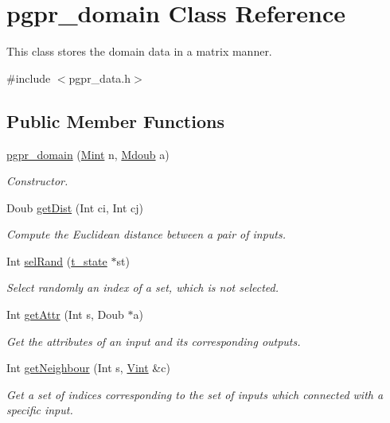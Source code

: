 \hypertarget{classpgpr__domain}{\section{pgpr\-\_\-domain Class Reference}
\label{classpgpr__domain}
}


This class stores the domain data in a matrix manner.  




{\ttfamily \#include $<$pgpr\-\_\-data.\-h$>$}

\subsection*{Public Member Functions}
\begin{DoxyCompactItemize}
\item 
\hyperlink{classpgpr__domain_ac527084df0c657962f29a554da0b3eea}{pgpr\-\_\-domain} (\hyperlink{classpgpr__matrix}{Mint} n, \hyperlink{classpgpr__matrix}{Mdoub} a)
\begin{DoxyCompactList}\small\item\em Constructor. \end{DoxyCompactList}\item 
Doub \hyperlink{classpgpr__domain_ac24189f56e27aad49dee703f5a58cc9b}{get\-Dist} (Int ci, Int cj)
\begin{DoxyCompactList}\small\item\em Compute the Euclidean distance between a pair of inputs. \end{DoxyCompactList}\item 
Int \hyperlink{classpgpr__domain_a814453a62ebc1ae9b4e420323bf013c2}{sel\-Rand} (\hyperlink{structt__state}{t\-\_\-state} $\ast$st)
\begin{DoxyCompactList}\small\item\em Select randomly an index of a set, which is not selected. \end{DoxyCompactList}\item 
Int \hyperlink{classpgpr__domain_a55b740e3d3a4a0c5bf86cd14895cd76b}{get\-Attr} (Int s, Doub $\ast$a)
\begin{DoxyCompactList}\small\item\em Get the attributes of an input and its corresponding outputs. \end{DoxyCompactList}\item 
Int \hyperlink{classpgpr__domain_ae07953124466fffafd45013bd7917ddd}{get\-Neighbour} (Int s, \hyperlink{classpgpr__vector}{Vint} \&c)
\begin{DoxyCompactList}\small\item\em Get a set of indices corresponding to the set of inputs which connected with a specific input. \end{DoxyCompactList}\end{DoxyCompactItemize}
